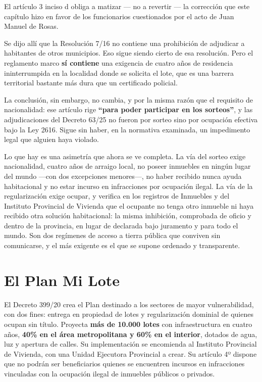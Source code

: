 El artículo 3 inciso d obliga a matizar --- no a revertir --- la corrección que este capítulo hizo en favor de los funcionarios cuestionados por el acto de Juan Manuel de Rosas.

Se dijo allí que la Resolución 7/16 no contiene una prohibición de adjudicar a habitantes de otros municipios. Eso sigue siendo cierto de esa resolución. Pero el reglamento marco \textbf{sí contiene} una exigencia de cuatro años de residencia ininterrumpida en la localidad donde se solicita el lote, que es una barrera territorial bastante más dura que un certificado policial.

La conclusión, sin embargo, no cambia, y por la misma razón que el requisito de nacionalidad: ese artículo rige \textbf{``para poder participar en los sorteos''}, y las adjudicaciones del Decreto 63/25 no fueron por sorteo sino por ocupación efectiva bajo la Ley 2616. Sigue sin haber, en la normativa examinada, un impedimento legal que alguien haya violado.

Lo que hay es una asimetría que ahora se ve completa. La vía del sorteo exige nacionalidad, cuatro años de arraigo local, no poseer inmuebles en ningún lugar del mundo ---con dos excepciones menores---, no haber recibido nunca ayuda habitacional y no estar incurso en infracciones por ocupación ilegal. La vía de la regularización exige ocupar, y verifica en los registros de Inmuebles y del Instituto Provincial de Vivienda que el ocupante no tenga otro inmueble ni haya recibido otra solución habitacional: la misma inhibición, comprobada de oficio y dentro de la provincia, en lugar de declarada bajo juramento y para todo el mundo. Son dos regímenes de acceso a tierra pública que conviven sin comunicarse, y el más exigente es el que se supone ordenado y transparente.


\section{El Plan Mi Lote}

El Decreto 399/20 crea el Plan destinado a los sectores de mayor vulnerabilidad, con dos fines: entrega en propiedad de lotes y regularización dominial de quienes ocupan sin título. Proyecta \textbf{más de 10.000 lotes} con infraestructura en cuatro años, \textbf{40\% en el área metropolitana y 60\% en el interior}, dotados de agua, luz y apertura de calles. Su implementación se encomienda al Instituto Provincial de Vivienda, con una Unidad Ejecutora Provincial a crear. Su artículo 4º dispone que no podrán ser beneficiarios quienes se encuentren incursos en infracciones vinculadas con la ocupación ilegal de inmuebles públicos o privados.

